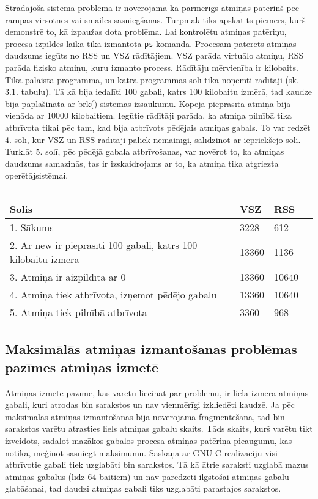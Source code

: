 Strādājošā sistēmā problēma ir novērojama kā pārmērīgs atmiņas patēriņš pēc rampas virsotnes vai smailes sasniegšanas.
Turpmāk tiks apskatīts piemērs, kurš demonstrē to, kā izpaužas dota problēma.
Lai kontrolētu atmiņas patēriņu, procesa izpildes laikā tika izmantota \texttt{ps} komanda.
Procesam patērēts atmiņas daudzums iegūts no RSS un VSZ rādītājiem.
VSZ parāda virtuālo atmiņu, RSS parāda fizisko atmiņu, kuru izmanto process.
Rādītāju mērvienība ir kilobaits.
Tika palaista programma, un katrā programmas solī tika noņemti radītāji (sk. 3.1. tabulu).
Tā kā bija iedalīti 100 gabali, katrs 100 kilobaitu izmērā, tad kaudze bija paplašināta ar brk() sistēmas izsaukumu.
Kopēja pieprasīta atmiņa bija vienāda ar 10000 kilobaitiem.
Iegūtie rādītāji parāda, ka atmiņa pilnībā tika atbrīvota tikai pēc tam, kad bija atbrīvots pēdējais atmiņas gabals.
To var redzēt 4. solī, kur VSZ un RSS rādītāji paliek nemainīgi, salīdzinot ar iepriekšējo soli.
Turklāt 5. solī, pēc pēdējā gabala atbrīvošanas, var novērot to, ka atmiņas daudzums samazinās, tas ir izskaidrojams ar to, ka atmiņa tika atgriezta operētājsistēmai.


\begin{table}[H]
\caption{\textbf{\fontsize{11}{12}\selectfont {Programmas RSS un VSZ radītāji}}}
\label{table:kysymys}
\centering
	\begin{tabular}{|l|l|l|p{5cm}|}
	  \hline
	Solis & VSZ & RSS \\
    \hline
    1. Sākums & 3228 & 612 \\
	\hline
	 2. Ar new ir pieprasīti 100 gabali, katrs 100 kilobaitu izmērā  & 13360  & 1136 \\
      \hline
     3. Atmiņa ir aizpildīta ar 0 &  13360 & 10640\\
      \hline
     4. Atmiņa tiek atbrīvota, izņemot pēdējo gabalu & 13360 & 10640 \\
      \hline
     5. Atmiņa tiek pilnībā atbrīvota & 3360 & 968 \\
    \hline
	\end{tabular}
\end{table}


\subsection{Maksimālās atmiņas izmantošanas problēmas pazīmes atmiņas izmetē}
Atmiņas izmetē pazīme, kas varētu liecināt par problēmu, ir lielā izmēra atmiņas gabali, kuri atrodas bin sarakstos un nav vienmērīgi  izkliedēti kaudzē.
Ja pēc maksimālās atmiņas izmantošanas bija novērojamā fragmentēšana, tad bin sarakstos varētu atrasties liels atmiņas gabalu skaits.
Tāds skaits, kurš varētu tikt izveidots, sadalot mazākos gabalos procesa atmiņas patēriņa pieaugumu, kas notika, mēģinot sasniegt maksimumu.
Saskaņā ar GNU C realizāciju visi atbrīvotie gabali tiek uzglabāti bin sarakstos.
Tā kā ātrie saraksti uzglabā mazus atmiņas gabalus (līdz 64 baitiem) un nav paredzēti ilgstošai atmiņas gabalu glabāšanai, tad daudzi atmiņas gabali tiks uzglabāti parastajos sarakstos.

